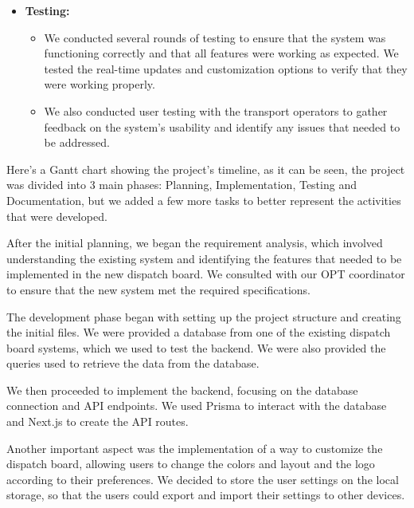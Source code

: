 \documentclass[10pt]{article}
\begin{document}
\begin{itemize}
\begin{itemize}
            \end{itemize}
            \item \textbf{Testing:}
            \begin{itemize}
                \item We conducted several rounds of testing to ensure that the system was functioning correctly and that all features were working as expected. We tested the real-time updates and customization options to verify that they were working properly.
                \item We also conducted user testing with the transport operators to gather feedback on the system's usability and identify any issues that needed to be addressed.
            \end{itemize}
        \end{itemize}

        Here's a Gantt chart showing the project's timeline, as it can be seen, the project was divided into 3 main phases: Planning, Implementation, Testing and Documentation, but we added a few more tasks to better represent the activities that were developed.

        After the initial planning, we began the requirement analysis, which involved understanding the existing system and identifying the features that needed to be implemented in the new dispatch board. We consulted with our OPT coordinator to ensure that the new system met the required specifications.

        The development phase began with setting up the project structure and creating the initial files. We were provided a database from one of the existing dispatch board systems, which we used to test the backend. We were also provided the queries used to retrieve the data from the database.

        We then proceeded to implement the backend, focusing on the database connection and API endpoints. We used Prisma to interact with the database and Next.js to create the API routes.

        Another important aspect was the implementation of a way to customize the dispatch board, allowing users to change the colors and layout and the logo according to their preferences. We decided to store the user settings on the local storage, so that the users could export and import their settings to other devices.
\end{document}

